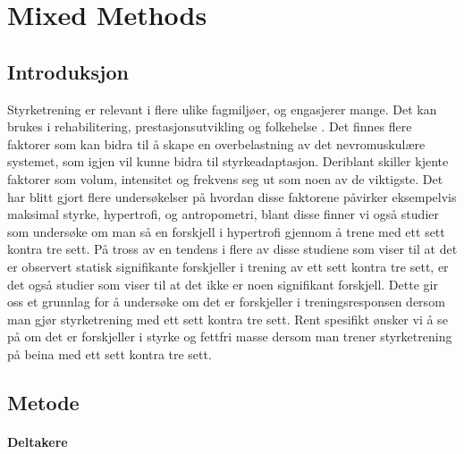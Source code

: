 \documentclass[
]{book}
\begin{document}
\hypertarget{mixed-methods}{%
\chapter{Mixed Methods}\label{mixed-methods}}

\hypertarget{introduksjon-1}{%
\section{Introduksjon}\label{introduksjon-1}}

Styrketrening er relevant i flere ulike fagmiljøer, og engasjerer mange. Det kan brukes i rehabilitering, prestasjonsutvikling og folkehelse \citep[\citet{cirer-sastre2017},\citet{lovell2016},\citet{suetta2007}]{hickey2020}. Det finnes flere faktorer som kan bidra til å skape en overbelastning av det nevromuskulære systemet, som igjen vil kunne bidra til styrkeadaptasjon\citep[\citet{marshall2011}]{rhea2002}. Deriblant skiller kjente faktorer som volum, intensitet og frekvens seg ut som noen av de viktigste. Det har blitt gjort flere undersøkelser på hvordan disse faktorene påvirker eksempelvis maksimal styrke, hypertrofi, og antropometri, blant disse finner vi også studier som undersøke om man så en forskjell i hypertrofi gjennom å trene med ett sett kontra tre sett\citetext{\citealp[\citet{rhea2002}]{schoenfeld2019}; \citealp{munn2005}; \citealp[\citet{carpinelli1998}]{fröhlich2010}}. På tross av en tendens i flere av disse studiene som viser til at det er observert statisk signifikante forskjeller i trening av ett sett kontra tre sett, er det også studier som viser til at det ikke er noen signifikant forskjell. Dette gir oss et grunnlag for å undersøke om det er forskjeller i treningsresponsen dersom man gjør styrketrening med ett sett kontra tre sett. Rent spesifikt ønsker vi å se på om det er forskjeller i styrke og fettfri masse dersom man trener styrketrening på beina med ett sett kontra tre sett.

\hypertarget{metode-1}{%
\section{Metode}\label{metode-1}}

\hypertarget{deltakere}{%
\subsubsection{Deltakere}\label{deltakere}}
\end{document}
